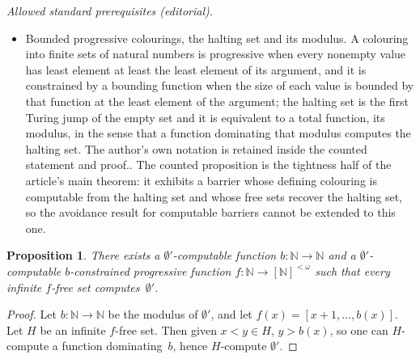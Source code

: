 \documentclass{article}
\newcommand{\NN}[0]{\mathbb{N}}
\newtheorem{proposition}[theorem]{Proposition}
\begin{document}
\noindent\textit{Allowed standard prerequisites (editorial).}\begin{itemize}
\item Bounded progressive colourings, the halting set and its modulus. A colouring into finite sets of natural numbers is progressive when every nonempty value has least element at least the least element of its argument, and it is constrained by a bounding function when the size of each value is bounded by that function at the least element of the argument; the halting set is the first Turing jump of the empty set and it is equivalent to a total function, its modulus, in the sense that a function dominating that modulus computes the halting set. The author's own notation is retained inside the counted statement and proof.. The counted proposition is the tightness half of the article's main theorem: it exhibits a barrier whose defining colouring is computable from the halting set and whose free sets recover the halting set, so the avoidance result for computable barriers cannot be extended to this one.
\end{itemize}\medskip
\begin{proposition}
There exists a $\emptyset'$-computable function $b : \NN \to \NN$ and a $\emptyset'$-computable $b$-constrained progressive function $f : \NN \to [\NN]^{<\omega}$ such that every infinite $f$-free set computes~$\emptyset'$.
\end{proposition}

\begin{proof}
Let $b : \NN \to \NN$ be the modulus of $\emptyset'$,
and let $f(x) = [x+1, \dots, b(x)]$. Let $H$ be an infinite $f$-free set.
Then given $x < y \in H$, $y > b(x)$, so one can $H$-compute a function dominating~$b$, hence $H$-compute $\emptyset'$.
\end{proof}
\end{document}
